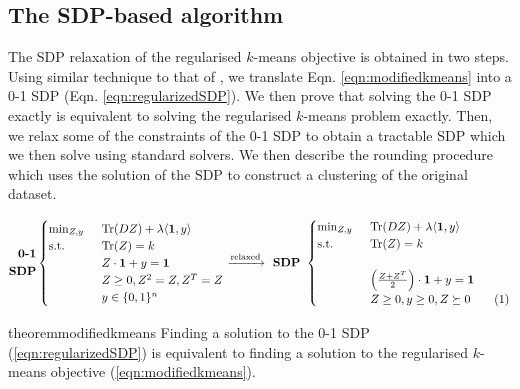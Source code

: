 \documentclass[12pt]{article}
\newcommand{\mb}{\mathbf}
\newcommand{\tr}{\text{Tr}}
\newcommand\numberthis{\addtocounter{equation}{1}\tag{\theequation}}
\begin{document}
 
\subsection{The SDP-based algorithm}
\label{subsection:sdpAlg}
The SDP relaxation of the regularised $k$-means objective is obtained in two steps. Using similar technique to that of \cite{peng2007approximating}, we translate Eqn. \ref{eqn:modifiedkmeans} into a 0-1 SDP (Eqn. \ref{eqn:regularizedSDP}). We then prove that solving the 0-1 SDP exactly is equivalent to solving the regularised $k$-means problem exactly. Then, we relax some of the constraints of the 0-1 SDP to obtain a tractable SDP which we then solve using standard solvers. We then describe the rounding procedure which uses the solution of the SDP to construct a clustering of the original dataset. 

\begin{equation*}
	\begin{split}
	\textbf{0-1}\\
	\textbf{SDP}
  \end{split}
	\begin{cases}
		\min_{Z, y} \enspace &\tr(DZ) + \lambda \langle \mb 1, y\rangle\\
		\text{s.t. } \enspace &\tr(Z) = k\\
		& Z\cdot \mb 1 + y = \mb 1\\	
		&Z\ge 0, Z^2 = Z,Z^T = Z \\
		& y \in \{0, 1\}^n
	\end{cases}
	\xrightarrow{\text{relaxed}} \textbf{ SDP } 
	\begin{cases}
		\min_{Z, y} \enspace &\tr(DZ) + \lambda \langle \mb 1, y\rangle\\
        \text{s.t. } \enspace &\tr(Z) = k\\
        \\
		& \Big(\frac{Z+Z^T}{2}\Big)\cdot \mb 1 + y = \mb 1\\		
		&Z \ge 0, y \ge 0, Z \succeq 0 \numberthis\label{eqn:regularizedSDP}
	\end{cases}
\end{equation*}

\begin{restatable}{theorem}{modifiedkmeans}
\label{thm:modifiedkmeans}
Finding a solution to the 0-1 SDP (\ref{eqn:regularizedSDP}) is equivalent to finding a solution to the regularised $k$-means objective (\ref{eqn:modifiedkmeans}). 
\end{restatable}
\end{document}
